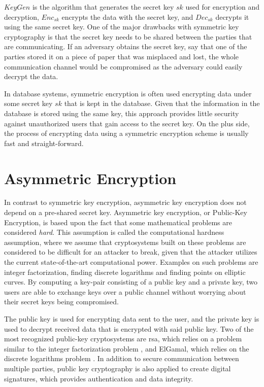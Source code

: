 $KeyGen$ is the algorithm that generates the secret key $sk$ used for encryption and decryption, $Enc_{sk}$ encrypts the data with the secret key, and $Dec_{sk}$ decrypts it using the same secret key. One of the major drawbacks with symmetric key cryptography is that the secret key needs to be shared between the parties that are communicating. If an adversary obtains the secret key, say that one of the parties stored it on a piece of paper that was misplaced and lost, the whole communication channel would be compromised as the adversary could easily decrypt the data.

In database systems, symmetric encryption is often used encrypting data under some secret key $sk$ that is kept in the database. Given that the information in the database is stored using the same key, this approach provides little security against unauthorized users that gain access to the secret key. On the plus side, the process of encrypting data using a symmetric encryption scheme is usually fast and straight-forward.


\section{Asymmetric Encryption}

In contrast to symmetric key encryption, asymmetric key encryption does not depend on a pre-shared secret key. Asymmetric key encryption, or Public-Key Encryption, is based upon the fact that some mathematical problems are considered \emph{hard}. This assumption is called the computational hardness assumption, where we assume that cryptosystems built on these problems are considered to be difficult for an attacker to break, given that the attacker utilizes the current state-of-the-art computational power. Examples on such problems are integer factorization, finding discrete logarithms and finding points on elliptic curves. By computing a key-pair consisting of a public key and a private key, two users are able to exchange keys over a public channel without worrying about their secret keys being compromised.


The public key is used for encrypting data sent to the user, and the private key is used to decrypt received data that is encrypted with said public key. Two of the most recognized public-key cryptosystems are \gls{rsa}, which relies on a problem similar to the integer factorization problem \cite{rivest1978data}, and ElGamal, which relies on the discrete logarithms problem \cite{elgamal}. In addition to secure communication between multiple parties, public key cryptography is also applied to create digital signatures, which provides authentication and data integrity.

